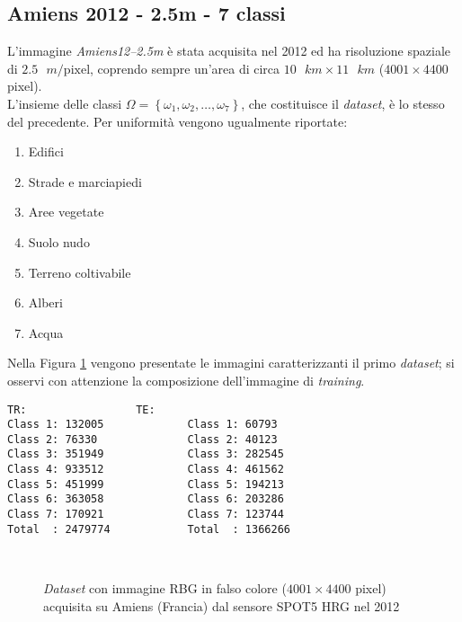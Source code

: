 \subsection{Amiens 2012 - 2.5m - 7 classi}
L'immagine \emph{Amiens12--2.5m} è stata acquisita nel 2012 ed ha  risoluzione spaziale di $2.5\text{ }m/\text{pixel}$, coprendo sempre un'area di circa $10\text{ }km\times11\text{ }km$ ($4001\times4400$ pixel).\\
L'insieme delle classi $\Omega=\left\lbrace\omega_1,\omega_2,\ldots,\omega_{7}\right\rbrace$, che costituisce il \emph{dataset}, è lo stesso del precedente. Per uniformità vengono ugualmente riportate:
\begin{enumerate}
\item Edifici
\item Strade e marciapiedi
\item Aree vegetate
\item Suolo nudo
\item Terreno coltivabile
\item Alberi
\item Acqua
\end{enumerate}
Nella Figura \ref{fig: Amiens122_5m} vengono presentate le immagini caratterizzanti il primo \emph{dataset}; si osservi con attenzione la composizione dell'immagine di \emph{training}.
\begin{lstlisting}[float=b,title={Distribuzione dei pixel di training e test classe per classe.},
                   label=lst:esempio, frame=lines]
TR:					TE:
Class 1: 132005				Class 1: 60793
Class 2: 76330				Class 2: 40123
Class 3: 351949				Class 3: 282545
Class 4: 933512				Class 4: 461562
Class 5: 451999				Class 5: 194213
Class 6: 363058				Class 6: 203286
Class 7: 170921				Class 7: 123744
Total  : 2479774			Total  : 1366266
\end{lstlisting}
\clearpage

\begin{figure}[!ht]
   \center
   \\%
     \hspace{4mm}
    \caption{\emph{Dataset} con immagine RBG in falso colore ($4001\times4400$ pixel) acquisita su Amiens (Francia) dal sensore \textsc{SPOT5 HRG} nel 2012}
    \label{fig: Amiens122_5m}
  \end{figure}
\clearpage

